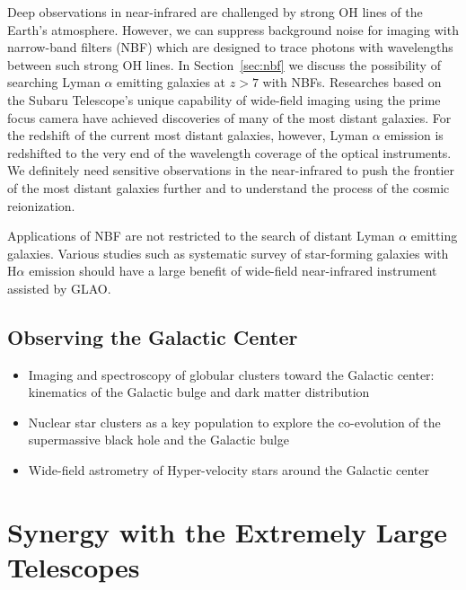 Deep observations in near-infrared are challenged by strong OH lines of
the Earth's atmosphere. However, we can suppress background noise for
imaging with narrow-band filters (NBF) which are designed to trace
photons with wavelengths between such strong OH lines. In
Section~\ref{sec:nbf} we discuss the possibility of searching Lyman
$\alpha$ emitting galaxies at $z>7$ with NBFs.
Researches based on the Subaru Telescope's unique capability of
wide-field imaging using the prime focus camera have achieved
discoveries of many of the most distant galaxies. For the redshift of
the current most distant galaxies, however, Lyman $\alpha$ emission is
redshifted to the very end of the wavelength coverage of the optical
instruments. We definitely need sensitive observations in the
near-infrared to push the frontier of the most distant galaxies
further and to understand the process of the cosmic reionization. 

Applications of NBF are not restricted to the search of distant Lyman
$\alpha$ emitting galaxies. Various studies such as systematic survey of
star-forming galaxies with H$\alpha$ emission should have a large
benefit of wide-field near-infrared instrument assisted by GLAO.


\subsection{Observing the Galactic Center}

\begin{itemize}
 \item Imaging and spectroscopy of globular clusters toward the Galactic
       center: kinematics of the Galactic bulge and dark matter
       distribution
 \item Nuclear star clusters as a key population to explore the
       co-evolution of the supermassive black hole and the Galactic bulge
 \item Wide-field astrometry of Hyper-velocity stars around the Galactic
       center
\end{itemize}


\section{Synergy with the Extremely Large Telescopes}

